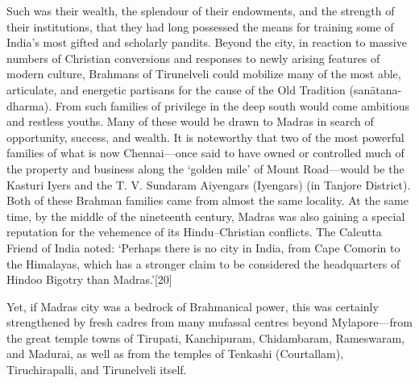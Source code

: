 {Such was their wealth, the splendour of their endowments, and the strength of their institutions, that they had long possessed the means for training some of India’s most gifted and scholarly pandits. Beyond the city, in reaction to massive numbers of Christian conversions and responses to newly arising features of modern culture, Brahmans of Tirunelveli could mobilize many of the most able, articulate, and energetic partisans for the cause of the Old Tradition (sanātana-dharma). From such families of privilege in the deep south would come ambitious and restless youths. Many of these would be drawn to Madras in search of opportunity, success, and wealth. It is noteworthy that two of the most powerful families of what is now Chennai—once said to have owned or controlled much of the property and business along the ‘golden mile’ of Mount Road—would be the Kasturi Iyers and the T. V. Sundaram Aiyengars (Iyengars) (in Tanjore District). Both of these Brahman families came from almost the same locality. At the same time, by the middle of the nineteenth century, Madras was also gaining a special reputation for the vehemence of its Hindu–Christian conflicts. The Calcutta Friend of India noted: ‘Perhaps there is no city in India, from Cape Comorin to the Himalayas, which has a stronger claim to be considered the headquarters of Hindoo Bigotry than Madras.’[20]

Yet, if Madras city was a bedrock of Brahmanical power, this was certainly strengthened by fresh cadres from many mufassal centres beyond Mylapore—from the great temple towns of Tirupati, Kanchipuram, Chidambaram, Rameswaram, and Madurai, as well as from the temples of Tenkashi (Courtallam), Tiruchirapalli, and Tirunelveli itself.

}
